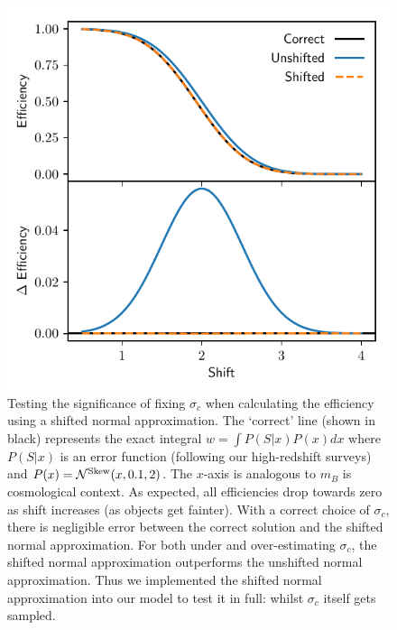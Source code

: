 \documentclass[a4paper,fleqn,usenatbib]{mnras}
\begin{document}
\begin{figure}
	\begin{center}
		\includegraphics[width=\columnwidth]{shift.pdf}
	\end{center}
	\caption{Testing the significance of fixing $\sigma_c$ when calculating the efficiency using a shifted normal approximation. The `correct' line (shown in black) represents the exact integral $w = \int P(S|x) P(x) dx$ where $P(S|x)$ is an error function (following our high-redshift surveys) and $P(x) = \mathcal{N}^{\rm Skew}(x, 0.1, 2)$. The $x$-axis is analogous to $m_B$ is cosmological context. As expected, all efficiencies drop towards zero as shift increases (as objects get fainter). With a correct choice of $\sigma_c$, there is negligible error between the correct solution and the shifted normal approximation. For both under and over-estimating $\sigma_c$, the shifted normal approximation outperforms the unshifted normal approximation. Thus we implemented the shifted normal approximation into our model to test it in full: whilst $\sigma_c$ itself gets sampled.}
	\label{fig:shift}
\end{figure}
\end{document}
